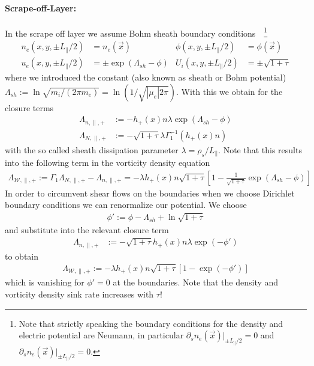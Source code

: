 \paragraph{Scrape-off-Layer:} In the scrape off layer we assume Bohm sheath 
boundary conditions~\cite{Mosetto2015}~\footnote{Note that strictly speaking the 
boundary conditions for the density and electric potential are Neumann, in 
particular \(\partial_s n_e (\vec{x}) |_{\pm L_\parallel /2 } =0 \) and 
\(\partial_s  n_e (\vec{x}) |_{\pm L_\parallel /2 } = 0\).}
\begin{align}
n_e (x,y,\pm L_\parallel /2 ) &= n_e (\vec{x}) &
\phi (x,y,\pm L_\parallel /2 ) &= \phi (\vec{x})\\
 u_e (x,y,\pm L_\parallel /2 ) &= \pm \exp{(\Lambda_{sh} - \phi)} &
 U_i (x,y,\pm L_\parallel /2 ) &= \pm\sqrt{1+\tau}
\end{align}
where we introduced the constant (also known as sheath or Bohm potential) 
\(\Lambda_{sh} := \ln \sqrt{m_i/(2 \pi m_e)} = \ln  (1/\sqrt{|\mu_e| 2 \pi})\). 
With this we obtain for the closure terms~\cite{HeldPhD}
\begin{align}
 \Lambda_{n,\parallel,+} &:= -h_{+}(x) n \lambda \exp{(\Lambda_{sh} - \phi)} \\
 \Lambda_{N,\parallel,+} &:=  -\sqrt{1 + \tau} \lambda \Gamma_1^{-1} ( h_{+}(x)  
n)
\end{align}
with the so called sheath dissipation parameter \(\lambda = 
\rho_s/L_\parallel\).
Note that this results into the following term in the vorticity density equation
\begin{align}
 \Lambda_{\mathcal{W},\parallel,+} := \Gamma_1\Lambda_{N,\parallel,+} - 
\Lambda_{n,\parallel,+} = -\lambda  h_{+}(x)  n \sqrt{1 + \tau} \left[1  -  
\frac{1}{\sqrt{1 + \tau}}\exp{(\Lambda_{sh} - \phi)} \right]
\end{align}
In order to circumvent \ExB shear flows on the boundaries when we choose Dirichlet boundary conditions we can renormalize our potential. We choose
\begin{align}
 \phi' := \phi - \Lambda_{sh}+ \ln{\sqrt{1+\tau}}
\end{align}
and substitute into the relevant closure term
\begin{align}
 \Lambda_{n,\parallel,+} &:= -\sqrt{1 + \tau}h_{+}(x) n \lambda \exp{(- \phi')} 
\end{align}
to obtain
\begin{align}
 \Lambda_{\mathcal{W},\parallel,+} :=  -\lambda  h_{+}(x)  n \sqrt{1 + \tau} \left[1  -  
\exp{(-\phi')} \right]
\end{align}
which is vanishing for \(\phi'=0\) at the boundaries. Note that the density and vorticity density sink rate increases with \(\tau\)!
